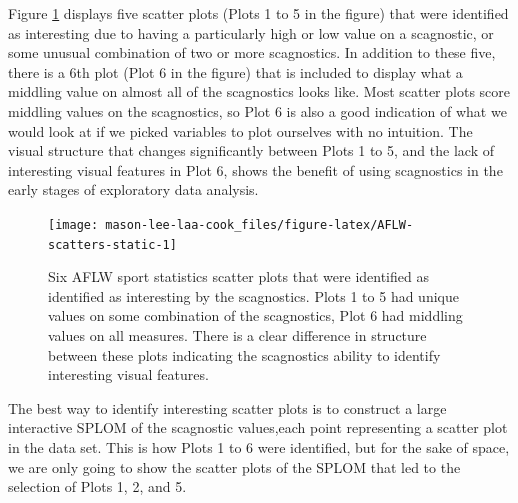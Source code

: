 Figure \ref{fig:AFLW-scatters-static} displays five scatter plots (Plots 1 to 5 in the figure) that were identified as interesting due to having a particularly high or low value on a scagnostic, or some unusual combination of two or more scagnostics. In addition to these five, there is a 6th plot (Plot 6 in the figure) that is included to display what a middling value on almost all of the scagnostics looks like. Most scatter plots score middling values on the scagnostics, so Plot 6 is also a good indication of what we would look at if we picked variables to plot ourselves with no intuition. The visual structure that changes significantly between Plots 1 to 5, and the lack of interesting visual features in Plot 6, shows the benefit of using scagnostics in the early stages of exploratory data analysis.

\begin{figure}

{\centering \texttt{[image: mason-lee-laa-cook\_files/figure-latex/AFLW-scatters-static-1]} 

}

\caption{Six AFLW sport statistics scatter plots that were identified as identified as interesting by the scagnostics. Plots 1 to 5 had unique values on some combination of the scagnostics, Plot 6 had middling values on all measures. There is a clear difference in structure between these plots indicating the scagnostics ability to identify interesting visual features.}\label{fig:AFLW-scatters-static}
\end{figure}

The best way to identify interesting scatter plots is to construct a large interactive SPLOM of the scagnostic values,each point representing a scatter plot in the data set. This is how Plots 1 to 6 were identified, but for the sake of space, we are only going to show the scatter plots of the SPLOM that led to the selection of Plots 1, 2, and 5.

